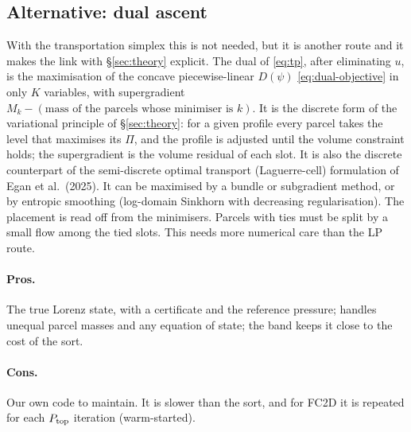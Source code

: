 \documentclass[11pt,a4paper]{article}
\newcommand{\Ptop}{P_{\rm top}}
\begin{document}
\subsection{Alternative: dual ascent}
With the transportation simplex this is not needed, but it is another route and it makes the link with \S\ref{sec:theory}
explicit. The dual of \eqref{eq:tp}, after eliminating $u$, is the maximisation of the concave piecewise-linear $D(\psi)$
\eqref{eq:dual-objective} in only $K$ variables, with supergradient $M_k-(\text{mass of the parcels whose minimiser is }k)$.
It is the discrete form of the variational principle of \S\ref{sec:theory}: for a given profile every parcel takes the level
that maximises its $\Pi$, and the profile is adjusted until the volume constraint holds; the supergradient is the volume residual
of each slot. It is also the discrete counterpart of the semi-discrete optimal transport (Laguerre-cell) formulation of Egan
et al.\ (2025). It can be maximised by a bundle or subgradient method, or by entropic smoothing (log-domain Sinkhorn with
decreasing regularisation). The placement is read off from the minimisers. Parcels with ties must be split by a small flow
among the tied slots. This needs more numerical care than the LP route.

\paragraph{Pros.} The true Lorenz state, with a certificate and the reference pressure; handles unequal parcel masses and any
equation of state; the band keeps it close to the cost of the sort.
\paragraph{Cons.} Our own code to maintain. It is slower than the sort, and for FC2D it is repeated for each $\Ptop$
iteration (warm-started).

\end{document}
